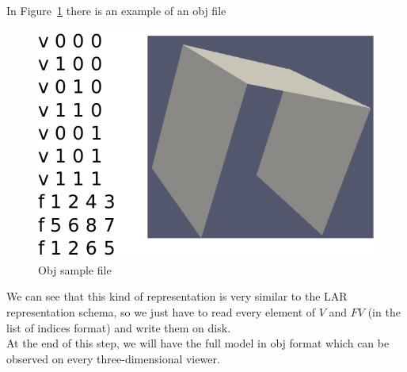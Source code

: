 In Figure~\ref{fig:objSample} there is an example of an obj file

\begin{figure}[htb] %
   \centering
   \includegraphics[width=0.40\linewidth]{images/objSample.png}
   \caption{Obj sample file}
   \label{fig:objSample}
\end{figure}

We can see that this kind of representation is very similar to the LAR representation schema, so we just have to read every element of $V$ and $FV$ (in the list of indices format) and write them on disk.\\

At the end of this step, we will have the full model in obj format which can be observed on every three-dimensional viewer.